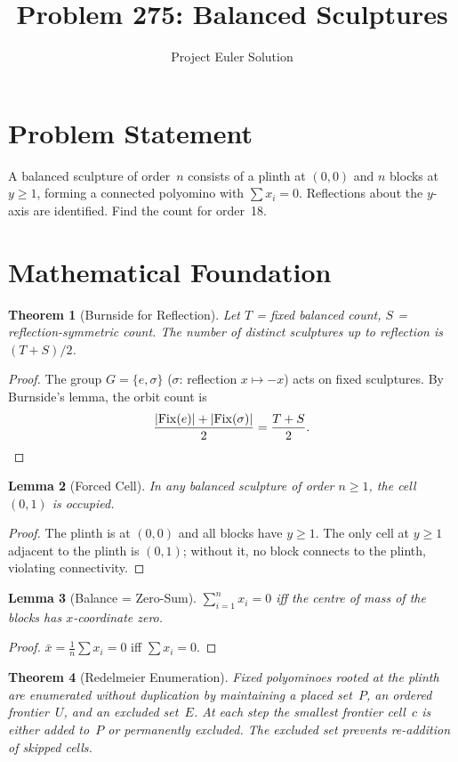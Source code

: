 \documentclass[12pt]{article}
\title{Problem 275: Balanced Sculptures}
\author{Project Euler Solution}
\date{}
\newtheorem{theorem}{Theorem}
\newtheorem{lemma}[theorem]{Lemma}
\begin{document}
\maketitle

\section{Problem Statement}
A balanced sculpture of order~$n$ consists of a plinth at $(0,0)$ and $n$ blocks at $y \ge 1$, forming a connected polyomino with $\sum x_i = 0$. Reflections about the $y$-axis are identified. Find the count for order~18.

\section{Mathematical Foundation}

\begin{theorem}[Burnside for Reflection]
Let $T$ = fixed balanced count, $S$ = reflection-symmetric count. The number of distinct sculptures up to reflection is $(T+S)/2$.
\end{theorem}

\begin{proof}
The group $G = \{e, \sigma\}$ ($\sigma$: reflection $x \mapsto -x$) acts on fixed sculptures. By Burnside's lemma, the orbit count is
\[
\frac{|\mathrm{Fix}(e)| + |\mathrm{Fix}(\sigma)|}{2} = \frac{T + S}{2}. \qedhere
\]
\end{proof}

\begin{lemma}[Forced Cell]
In any balanced sculpture of order $n \ge 1$, the cell $(0,1)$ is occupied.
\end{lemma}

\begin{proof}
The plinth is at $(0,0)$ and all blocks have $y \ge 1$. The only cell at $y \ge 1$ adjacent to the plinth is $(0,1)$; without it, no block connects to the plinth, violating connectivity.
\end{proof}

\begin{lemma}[Balance = Zero-Sum]
$\sum_{i=1}^n x_i = 0$ iff the centre of mass of the blocks has $x$-coordinate zero.
\end{lemma}

\begin{proof}
$\bar{x} = \frac{1}{n}\sum x_i = 0$ iff $\sum x_i = 0$.
\end{proof}

\begin{theorem}[Redelmeier Enumeration]
Fixed polyominoes rooted at the plinth are enumerated without duplication by maintaining a placed set~$P$, an ordered frontier~$U$, and an excluded set~$E$. At each step the smallest frontier cell~$c$ is either added to~$P$ or permanently excluded. The excluded set prevents re-addition of skipped cells.
\end{theorem}
\end{document}
